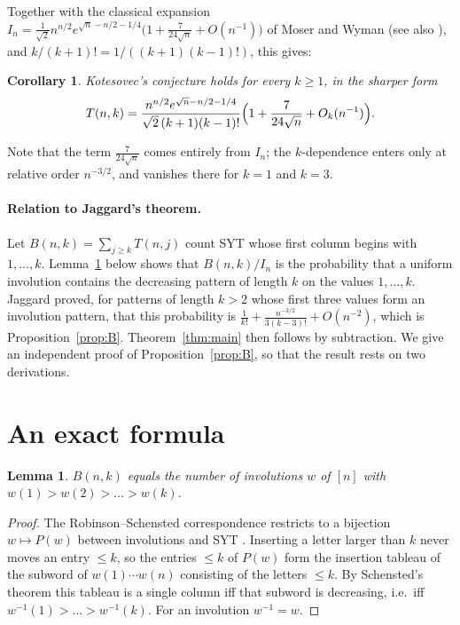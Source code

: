 \documentclass[11pt,a4paper]{article}
\newtheorem{lemma}[theorem]{Lemma}
\newtheorem{corollary}[theorem]{Corollary}
\theoremstyle{remark}
\begin{document}
Together with the classical expansion $I_n=\frac{1}{\sqrt2}n^{n/2}e^{\sqrt n-n/2-1/4}\bigl(1+\frac7{24\sqrt n}+O(n^{-1})\bigr)$ of Moser and Wyman \cite{MW} (see also \cite[\S5.1.4]{Knuth}), and $k/(k+1)!=1/((k+1)(k-1)!)$, this gives:

\begin{corollary}
Kotesovec's conjecture holds for every $k\ge1$, in the sharper form
\[
 T(n,k)=\frac{n^{n/2}e^{\sqrt n-n/2-1/4}}{\sqrt2\,(k+1)(k-1)!}\Bigl(1+\frac7{24\sqrt n}+O_k(n^{-1})\Bigr).
\]
\end{corollary}

Note that the term $\frac7{24\sqrt n}$ comes entirely from $I_n$; the $k$-dependence enters only at relative order $n^{-3/2}$, and vanishes there for $k=1$ and $k=3$.

\paragraph{Relation to Jaggard's theorem.} Let $B(n,k)=\sum_{j\ge k}T(n,j)$ count SYT whose first column begins with $1,\dots,k$. Lemma~\ref{lem:RS} below shows that $B(n,k)/I_n$ is the probability that a uniform involution contains the decreasing pattern of length $k$ on the values $1,\dots,k$. Jaggard \cite{Jaggard} proved, for patterns of length $k>2$ whose first three values form an involution pattern, that this probability is $\frac1{k!}+\frac{n^{-3/2}}{3(k-3)!}+O(n^{-2})$, which is Proposition~\ref{prop:B}. Theorem~\ref{thm:main} then follows by subtraction. We give an independent proof of Proposition~\ref{prop:B}, so that the result rests on two derivations.

\section{An exact formula}

\begin{lemma}\label{lem:RS}
$B(n,k)$ equals the number of involutions $w$ of $[n]$ with $w(1)>w(2)>\dots>w(k)$.
\end{lemma}

\begin{proof}
The Robinson--Schensted correspondence restricts to a bijection $w\mapsto P(w)$ between involutions and SYT \cite{Schensted,Knuth}. Inserting a letter larger than $k$ never moves an entry $\le k$, so the entries $\le k$ of $P(w)$ form the insertion tableau of the subword of $w(1)\cdots w(n)$ consisting of the letters $\le k$. By Schensted's theorem this tableau is a single column iff that subword is decreasing, i.e.\ iff $w^{-1}(1)>\dots>w^{-1}(k)$. For an involution $w^{-1}=w$.
\end{proof}
\end{document}
